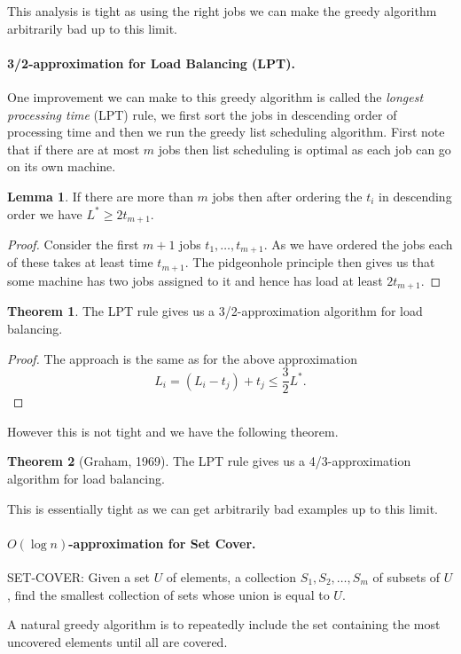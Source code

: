 \documentclass[11pt,a4paper]{article}
\theoremstyle{definition}
\newtheorem{thm}{Theorem}
\newtheorem{lem}{Lemma}
\begin{document}
This analysis is tight as using the right jobs we can make the greedy algorithm arbitrarily bad up to this limit.

\paragraph{3/2-approximation for Load Balancing (LPT).}
One improvement we can make to this greedy algorithm is called the \emph{longest processing time} (LPT) rule, we first sort the jobs in descending order of processing time and then we run the greedy list scheduling algorithm.
First note that if there are at most $m$ jobs then list scheduling is optimal as each job can go on its own machine.
\begin{lem}
If there are more than $m$ jobs then after ordering the $t_i$ in descending order we have $L^* \ge 2 t_{m+1}$.
\end{lem}
\begin{proof}
Consider the first $m+1$ jobs $t_1,\ldots,t_{m+1}$.
As we have ordered the jobs each of these takes at least time $t_{m+1}$.
The pidgeonhole principle then gives us that some machine has two jobs assigned to it and hence has load at least $2t_{m+1}$.
\end{proof}

\begin{thm}
The LPT rule gives us a 3/2-approximation algorithm for load balancing.
\end{thm}
\begin{proof}
The approach is the same as for the above approximation
\[
L_i = (L_i - t_j) + t_j \le \frac{3}{2} L^*.
\]
\end{proof}
However this is not tight and we have the following theorem.
\begin{thm}[Graham, 1969]
The LPT rule gives us a 4/3-approximation algorithm for load balancing.
\end{thm}
This is essentially tight as we can get arbitrarily bad examples up to this limit.

\paragraph{$O(\log n)$-approximation for Set Cover.}
SET-COVER: Given a set $U$ of elements, a collection $S_1,S_2,\ldots,S_m$ of subsets of $U$, find the smallest collection of sets whose union is equal to $U$.

A natural greedy algorithm is to repeatedly include the set containing the most uncovered elements until all are covered.
\end{document}
